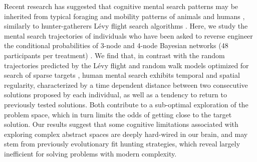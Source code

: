 
Recent research \cite{baronchelli2013levy} has suggested that cognitive mental search patterns \cite{rhodes2007human,radicchi2012rationality,radicchi2012evolution} may be inherited 
from typical foraging and mobility patterns of animals \cite{viswanathan1996levy,ramos2004levy,reynolds2007displaced} and humans \cite{gonzalez2008understanding,song2010modelling,rhee2011levy}, similarly to 
hunter-gatherers L\'evy flight search algorithms \cite{brown2007levy,raichlen2014evidence}. Here, we study the mental search trajectories of  
individuals who have been asked to reverse engineer the conditional probabilities of 3-node and 4-node Bayesian 
networks (48 participants per treatment) \cite{steyvers2003inferring,pearl2009causality}. We find that, in contrast with the random 
trajectories predicted by the L\'evy flight and random walk models optimized for search of sparse targets \cite{viswanathan1999optimizing,edwards2007revisiting,song2010modelling,viswanathan2011physics}, human mental 
search exhibits temporal and spatial regularity, characterized by a time dependent distance 
between two consecutive solutions proposed by each individual, as well as a tendency 
to return to previously tested solutions. Both contribute to a sub-optimal exploration of the 
problem space, which in turn limits the odds of getting close to the target solution. Our results 
suggest that some cognitive limitations associated with exploring complex abstract spaces are 
deeply hard-wired in our brain, and may stem from previously evolutionary fit hunting strategies, 
which reveal largely inefficient for solving problems with modern complexity.
